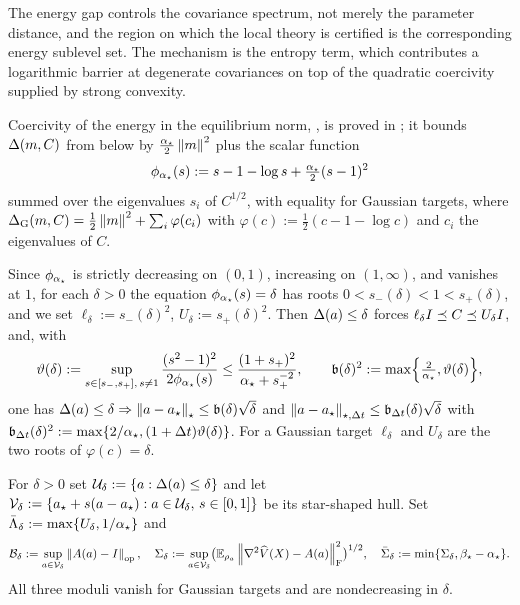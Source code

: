 The energy gap controls the covariance spectrum, not merely the parameter distance, and the
region on which the local theory is certified is the corresponding energy sublevel set. The
mechanism is the entropy term, which contributes a logarithmic barrier at
degenerate covariances on top of the quadratic coercivity supplied by strong convexity.

Coercivity of the energy in the equilibrium norm, , is proved in
; it bounds $\Delta(m,C)$ from below by
$\tfrac{\alpha_\star}2\left\lVert m\right\rVert^2$ plus the scalar function
\[
    \phi_{\alpha_\star}(s):=s-1-\log s+\tfrac{\alpha_\star}2(s-1)^2
\]
summed over the eigenvalues $s_i$ of $C^{1/2}$, with equality for Gaussian targets, where
$\Delta_{\mathrm G}(m,C)=\tfrac12\left\lVert m\right\rVert^2+\sum_i\varphi(c_i)$ with
$\varphi(c):=\tfrac12(c-1-\log c)$ and $c_i$ the eigenvalues of $C$.

Since $\phi_{\alpha_\star}$ is strictly decreasing on $(0,1)$, increasing on $(1,\infty)$, and
vanishes at $1$, for each $\delta>0$ the equation $\phi_{\alpha_\star}(s)=\delta$ has roots
$0<s_-(\delta)<1<s_+(\delta)$, and we set $\ell_\delta:=s_-(\delta)^2$,
$U_\delta:=s_+(\delta)^2$. Then $\Delta(a)\leq\delta$ forces
$\ell_\delta I\preceq C\preceq U_\delta I$, and, with
\begin{equation}
\label{eq:band-conversion}
    \vartheta(\delta):=\sup_{s\in[s_-,s_+],\,s\neq1}\frac{(s^2-1)^2}{2\phi_{\alpha_\star}(s)}
    \leq\frac{(1+s_+)^2}{\alpha_\star+s_+^{-2}},
    \qquad
    \mathfrak b(\delta)^2:=\max\Bigl\{\tfrac2{\alpha_\star},\vartheta(\delta)\Bigr\},
\end{equation}
one has $\Delta(a)\leq\delta\Rightarrow\left\lVert a-a_\star\right\rVert_\star\leq\mathfrak b(\delta)\sqrt\delta$
and $\left\lVert a-a_\star\right\rVert_{\star,\Delta t}\leq\mathfrak b_{\Delta t}(\delta)\sqrt\delta$ with
$\mathfrak b_{\Delta t}(\delta)^2:=\max\{2/\alpha_\star,(1+\Delta t)\vartheta(\delta)\}$. For a
Gaussian target $\ell_\delta$ and $U_\delta$ are the two roots of $\varphi(c)=\delta$.

\begin{definition}
\label{def:region}
For $\delta>0$ set $\mathcal{U}_\delta:=\{a:\Delta(a)\leq\delta\}$ and let
$\mathcal V_\delta:=\{a_\star+s(a-a_\star):a\in\mathcal{U}_\delta,\,s\in[0,1]\}$ be its star-shaped
hull. Set $\bar\Lambda_\delta:=\max\{U_\delta,1/\alpha_\star\}$ and
\[
    \mathcal B_\delta:=\sup_{a\in\mathcal V_\delta}\left\lVert A(a)-I\right\rVert_{\mathrm{op}},
    \quad
    \Sigma_\delta:=\sup_{a\in\mathcal V_\delta}\bigl(\mathbb{E}_{\rho_a}\left\lVert \nabla^2\widehat V(X)-A(a)\right\rVert_{\mathrm{F}}^2\bigr)^{1/2},
    \quad
    \bar\Sigma_\delta:=\min\{\Sigma_\delta,\beta_\star-\alpha_\star\}.
\]
All three moduli vanish for Gaussian targets and are nondecreasing in $\delta$.
\end{definition}

